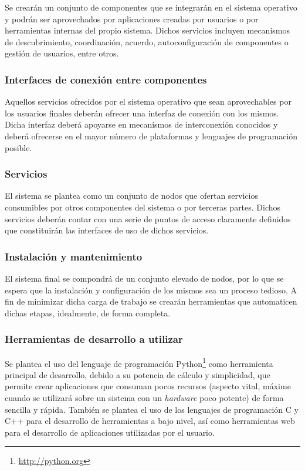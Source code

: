 Se crearán un conjunto de componentes que se integrarán en el sistema operativo y podrán ser aprovechados por aplicaciones creadas por usuarios o por herramientas internas del propio sistema. Dichos servicios incluyen mecanismos de descubrimiento, coordinación, acuerdo, autoconfiguración de componentes o gestión de usuarios, entre otros.

\subsubsection{Interfaces de conexión entre componentes}

Aquellos servicios ofrecidos por el sistema operativo que sean aprovechables por los usuarios finales deberán ofrecer una interfaz de conexión con los mismos. Dicha interfaz deberá apoyarse en mecanismos de interconexión conocidos y deberá ofrecerse en el mayor número de plataformas y lenguajes de programación posible.

\subsubsection{Servicios}

El sistema se plantea como un conjunto de nodos que ofertan servicios consumibles por otros componentes del sistema o por terceras partes. Dichos servicios deberán contar con una serie de puntos de acceso claramente definidos que constituirán las interfaces de uso de dichos servicios.

\subsubsection{Instalación y mantenimiento}

El sistema final se compondrá de un conjunto elevado de nodos, por lo que se espera que la instalación y configuración de los mismos sea un proceso tedioso. A fin de minimizar dicha carga de trabajo se crearán herramientas que automaticen dichas etapas, idealmente, de forma completa.

\subsubsection{Herramientas de desarrollo a utilizar}

Se plantea el uso del lenguaje de programación Python\footnote{\href{http://www.python.org}{http://python.org}} como herramienta principal de desarrollo, debido a su potencia de cálculo y simplicidad, que permite crear aplicaciones que consuman pocos recursos (aspecto vital, máxime cuando se utilizará sobre un sistema con un \textit{hardware} poco potente) de forma sencilla y rápida. También se plantea el uso de los lenguajes de programación C y C++ para el desarrollo de herramientas a bajo nivel, así como herramientas web para el desarrollo de aplicaciones utilizadas por el usuario.

